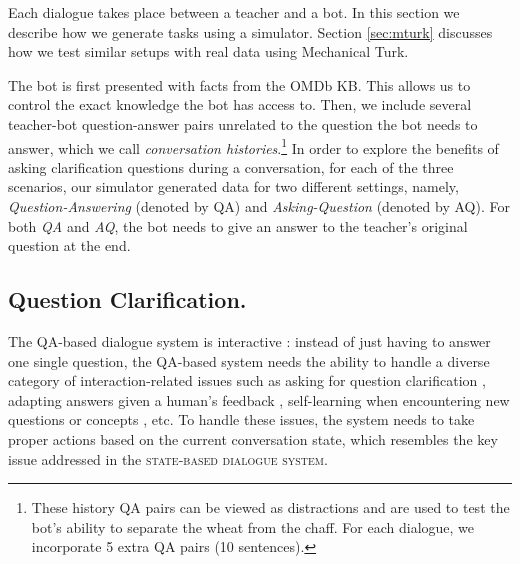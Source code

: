 Each dialogue takes place between a teacher and a bot. In this
section we describe how we generate tasks using a simulator. Section \ref{sec:mturk}
 discusses how  we test similar setups with real data using Mechanical Turk.

The bot is first presented with facts from the OMDb KB.
This allows us to control the exact knowledge the bot has access to.
Then, we include several teacher-bot question-answer pairs unrelated to
the question the bot needs to answer, which we call \emph{conversation histories}.\footnote{
These history QA pairs can be viewed as distractions and are used to test the
bot's ability to separate the wheat from the chaff.
For each dialogue, we incorporate 5 extra QA pairs (10 sentences).}
%
In order to explore the benefits of asking clarification questions 
during a conversation, for each of the three scenarios, our 
simulator generated data for two different settings, namely, 
\emph{Question-Answering} (denoted by QA) and 
\emph{Asking-Question} (denoted by AQ).
For both {\it QA} and {\it AQ}, the bot needs to give an answer to the teacher's original question at the end.



\subsection{ Question Clarification.}


The QA-based dialogue system is interactive \cite{rieser2009does}: instead of just having to answer one single question, 
the QA-based system needs the ability to handle a diverse category of interaction-related issues such as 
 asking for question clarification \cite{stoyanchev2013modelling,stoyanchev2014towards}, adapting answers given 
a human's feedback \cite{rieser2009does}, 
self-learning when encountering new questions or concepts
\cite{purver2006clarie}, etc.
To handle these issues, 
 the system needs to 
 take proper  actions based on the current conversation state, which resembles the key issue addressed in the \textsc{state-based dialogue system}. 


